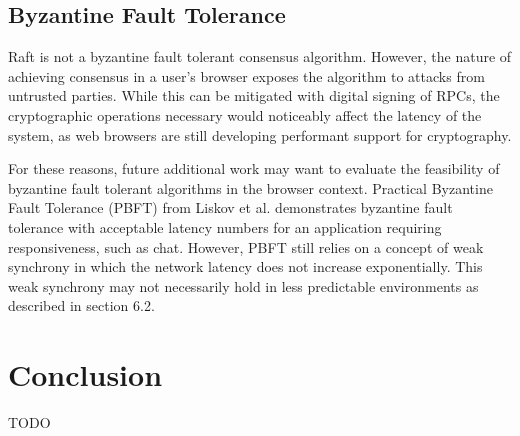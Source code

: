 \documentclass[11pt,twocolumn]{article}
\begin{document}
\subsection{Byzantine Fault Tolerance}
Raft is not a byzantine fault tolerant consensus algorithm. However, the nature of achieving consensus in a user's browser exposes the algorithm to attacks from untrusted parties. While this can be mitigated with digital signing of RPCs, the cryptographic operations necessary would noticeably affect the latency of the system, as web browsers are still developing performant support for cryptography.

For these reasons, future additional work may want to evaluate the feasibility of byzantine fault tolerant algorithms in the browser context. Practical Byzantine Fault Tolerance (PBFT) from Liskov et al. demonstrates byzantine fault tolerance with acceptable latency numbers for an application requiring responsiveness, such as chat. However, PBFT still relies on a concept of weak synchrony in which the network latency does not increase exponentially. This weak synchrony may not necessarily hold in less predictable environments as described in section 6.2.


\section{Conclusion}
TODO

\printbibliography
\end{document}
